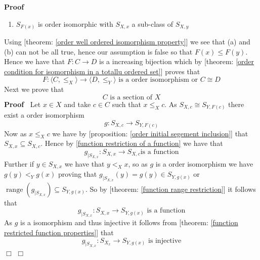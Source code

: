 \documentclass{book}
\newcommand{\tmop}[1]{\ensuremath{\operatorname{#1}}}
\newenvironment{enumeratealpha}{\begin{enumerate}[a{\textup{)}}] }{\end{enumerate}}
\newenvironment{proof}{\noindent\textbf{Proof\ }}{\hspace*{\fill}$\Box$\medskip}
\begin{document}
\begin{proof}
\begin{enumeratealpha}
    \item $S_{F (x)}$ is order isomorphic with $S_{X, x}$ a sub-class of
    $S_{X, y}$
  \end{enumeratealpha}
  Using [theorem: \ref{order well ordered isomorphism property}] we see that
  (a) and (b) can not be all true, hence our assumption is false so that $F
  (x) \leqslant F (y)$. Hence we have that $F : C \rightarrow D$ is a
  increasing bijection which by [theorem: \ref{order condition for isomorphism
  in a totallu ordered set}] proves that
  \begin{equation}
    \label{eq 3.21.014.1} F : \langle C, \leqslant_X \rangle \rightarrow
    \langle D, \leqslant_Y \rangle \text{ is a order isomorphism or } C \cong
    D
  \end{equation}
  Next we prove that
  \begin{equation}
    \label{eq 3.25.015} C \text{ is a section of } X
  \end{equation}
  \begin{proof}
    Let $x \in X$ and take $c \in C$ such that $x \leqslant_X c$. As $S_{X, c}
    \cong S_{Y, F (c)}$ there exist a order isomorphism
    \begin{equation}
      \label{eq 3.25.014} g : S_{X, c} \rightarrow S_{Y, F (c)}
    \end{equation}
    Now as $x \leqslant_X c$ we have by [proposition: \ref{order initial
    segement inclusion}] that $S_{X, x} \subseteq S_{X, c}$. Hence by
    \ref{function restriction of a function} we have that
    \begin{equation}
      \label{eq 3.26.014} g_{|S_{X, x}} : S_{X, x} \rightarrow S_{X, c} \text{
      is a function}
    \end{equation}
    Further if $y \in S_{X, x}$ we have that $y <_X x$, so as $g$ is a order
    isomorphism we have $g (y) <_Y g (x)$ proving that $g_{|S_{X, x}} (y) = g
    (y) \in S_{Y, g (x)}$ or $\tmop{range} (g_{|S_{X, x}}) \subseteq S_{Y, g
    (x)}$. So by [theorem: \ref{function range restriction}] it follows that
    \begin{equation}
      \label{eq 3.27.014} g_{|S_{X, x}} : S_{X, x} \rightarrow S_{Y, g (x)}
      \text{ is a function}
    \end{equation}
    As $g$ is a isomorphism and thus injective it follows from [theorem:
    \ref{function restricted function properties}] that
    \begin{equation}
      \label{eq 3.28.014} g_{|S_{X, x}} : S_{X_x} \rightarrow S_{Y, g (x)}
      \text{ is injective}

\end{equation}
\end{proof}
\end{proof}
\end{document}
